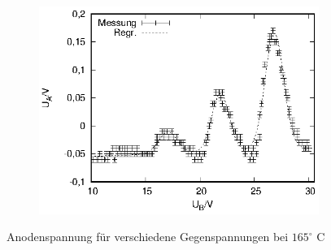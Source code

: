 \begin{figure}[h!]
\begin{subfigure}[h]{0.5\textwidth}
  \end{subfigure}%
  \begin{subfigure}[h]{0.5\textwidth}
    \centering
    \includegraphics{data/fh/165K4V.eps}
  \end{subfigure}
  \caption{Anodenspannung für verschiedene Gegenspannungen bei $165^\circ$ C}
  \label{fig:kennlinien2}
\end{figure}


